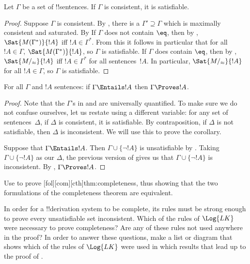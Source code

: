 \documentclass[../../include/open-logic-section]{subfiles}
\begin{document}

\begin{thm}
Let $\Gamma$ be a set of !!{sentence}s.  If
$\Gamma$ is consistent, it is satisfiable.
\end{thm}

\begin{proof}
Suppose $\Gamma$ is consistent.  By , there
is a $\Gamma' \supseteq \Gamma$ which is maximally consistent and
saturated.  By  If $\Gamma$ does not contain
$\eq$, then by , $\Sat{M(\Gamma^*)}{!A}$ iff $!A
\in \Gamma^*$.  From this it follows in particular that for all $!A
\in \Gamma$, $\Sat{M(\Gamma^*)}{!A}$, so $\Gamma$ is satisfiable.  If
$\Gamma$ does contain $\eq$, then by ,
$\Sat{M/_\approx}{!A}$ iff $!A \in \Gamma^*$ for all
sentences~$!A$. In particular, $\Sat{M/_\approx}{!A}$ for all $!A \in
\Gamma$, so $\Gamma$ is satisfiable.
\end{proof}

\begin{cor}
For all $\Gamma$ and $!A$ sentences: if $\Gamma \Entails !A$ then
$\Gamma \Proves !A$.
\end{cor}

\begin{proof}
Note that the $\Gamma$'s in  and
 are universally quantified. To make sure we
do not confuse ourselves, let us restate 
using a different variable: for any set of sentences~$\Delta$, if
$\Delta$ is consistent, it is satisfiable.  By contraposition, if
$\Delta$ is not satisfiable, then $\Delta$ is inconsistent. We will
use this to prove the corollary.

Suppose that $\Gamma \Entails !A$. Then $\Gamma \cup \{\lnot !A\}$ is
unsatisfiable by . Taking $\Gamma
\cup \{\lnot !A\}$ as our $\Delta$, the previous version of
 gives us that $\Gamma \cup \{\lnot !A\}$ is
inconsistent. By , $\Gamma \Proves
!A$.
\end{proof}

\begin{prob}
Use  to prove
[fol][com][cth]{thm:completeness}, thus showing that the two
formulations of the completeness theorem are equivalent.
\end{prob}

\begin{prob}
In order for a !!{derivation} system to be complete, its rules must be
strong enough to prove every unsatisfiable set inconsistent.  Which of
the rules of $\Log{LK}$ were necessary to prove completeness?  Are any
of these rules not used anywhere in the proof?  In order to answer
these questions, make a list or diagram that shows which of the rules
of $\Log{LK}$ were used in which results that lead up to the proof of
.
\end{prob}
\end{document}

